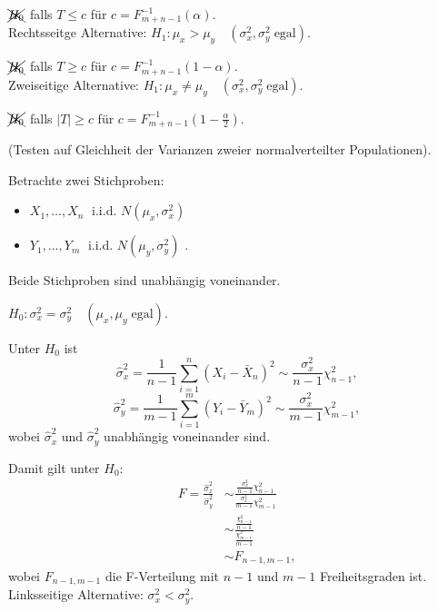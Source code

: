 \documentclass{tstextbook}
\begin{document}
\begin{example}
	$ \xcancel{H_0} $ falls $ T \le c $ für $ c = F_{m+n-1}^{-1}(\alpha) $. \\
	

	Rechtsseitge Alternative: $ H_1\colon \mu_x > \mu_y \quad (\sigma_x^2, \sigma_y^2 \; \text{egal}) $. 
	
	$ \xcancel{H_0} $ falls $ T \ge c $ für $ c = F_{m+n-1}^{-1}(1-\alpha) $. \\
	

	Zweiseitige Alternative: $ H_1\colon \mu_x \ne \mu_y \quad (\sigma_x^2, \sigma_y^2 \; \text{egal}) $. 
	
	$ \xcancel{H_0} $ falls $ |T| \ge c $ für $ c = F_{m+n-1}^{-1}\left(1-\frac{\alpha}{2}\right) $.
\end{example}

\begin{example}
	(Testen auf Gleichheit der Varianzen zweier normalverteilter Populationen).
	
	Betrachte zwei Stichproben:
		\begin{itemize}
		\item $ X_1,\ldots,X_n \;$ i.i.d. $ N\left(\mu_x, \sigma_x^2\right) $ 
		\item $ Y_1,\ldots,Y_m \;$ i.i.d. $ N\left(\mu_y, \sigma_y^2\right) $ .
	\end{itemize}
	Beide Stichproben sind unabhängig voneinander.
	
	$ H_0 \colon \sigma_x^2 = \sigma_y^2 \quad (\mu_x,\mu_y \; \text{egal}) $.
	
	Unter $ H_0 $ ist 
	\[ 
	\hat{\sigma}_x^2 = \frac{1}{n-1}\sum_{i=1}^{n}(X_i-\bar{X}_n)^2 \sim \frac{\sigma_x^2}{n-1}\chi^2_{n-1} ,
	\]
		\[ 
	\hat{\sigma}_y^2 = \frac{1}{m-1}\sum_{i=1}^{m}(Y_i-\bar{Y}_m)^2 \sim \frac{\sigma_x^2}{m-1}\chi^2_{m-1} ,
	\] wobei $ \hat{\sigma}_x^2 $ und $ \hat{\sigma}_y^2 $ unabhängig voneinander sind.
	
	Damit gilt unter $H_0$: 
	\[
	\begin{aligned}
		F = \frac{\hat{\sigma}_x^2}{\hat{\sigma}_y^2} & \sim \frac{\frac{\sigma_x^2}{n-1}\chi^2_{n-1}}{\frac{\sigma_x^2}{m-1}\chi^2_{m-1}} \\
		& \sim \frac{\frac{\chi^2_{n-1}}{n-1}}{\frac{\chi^2_{m-1}}{m-1}} \\
		& \sim F_{n-1,m-1}, 
	\end{aligned}
	\] wobei $ F_{n-1,m-1} $ die F-Verteilung mit $ n-1 $ und $ m-1 $ Freiheitsgraden ist. \\
	
	Linksseitige Alternative: $ \sigma_x^2 < \sigma_y^2 $. 
	

\end{example}
\end{document}
